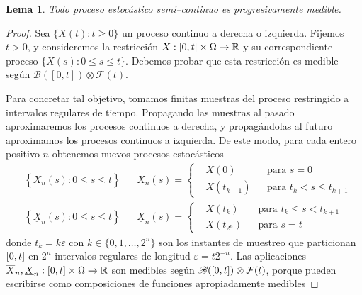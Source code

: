\documentclass{report}
\newcommand{\leftOpenInterval}{\left]}
\newcommand{\rightOpenInterval}{\right[}
\newcommand{\leftClosedInterval}{\left[}
\newcommand{\rightClosedInterval}{\right]}
\newcommand{\interval}[3]{%
    \ifstrequal{#1}{oo}{%
      \leftOpenInterval #2, #3 \rightOpenInterval%
    }{%
      \ifstrequal{#1}{co}{%
        \leftClosedInterval #2, #3 \rightOpenInterval%
      }{%
        \ifstrequal{#1}{oc}{
          \leftOpenInterval #2, #3 \rightClosedInterval%
        }{%
          \ifstrequal{#1}{cc}{
            \leftClosedInterval #2, #3 \rightClosedInterval
          }{%
          }%
        }%
      }%
    }%
  }
\newcommand{\events}{\mathcal{F}}
\newcommand{\borel}{\mathscr{B}}
\newcommand{\realNumbers}{\mathbb{R}}
\theoremstyle{plain}
\newtheorem{lemma}{Lema}
\theoremstyle{remark}
\theoremstyle{definition}
\begin{document}
\begin{lemma}
  \label{lemma:semiContinuousProcessesAreProgressivelyMeasurable}
  Todo proceso estocástico semi--continuo es progresivamente medible.
\end{lemma}
\begin{proof}
  Sea \(\{X(t) : t \geq 0\}\) un proceso continuo a derecha o izquierda.
  Fijemos \(t > 0\), y consideremos la restricción \(X : \interval{cc}{0}{t} \times \Omega \rightarrow \realNumbers\) y su correspondiente proceso \(\{X(s) : 0 \leq s \leq t\}\).
  Debemos probar que esta restricción es medible según \(\borel([0, t]) \otimes \events(t)\).

  Para concretar tal objetivo, tomamos finitas muestras del proceso restringido a intervalos regulares de tiempo.
  Propagando las muestras al pasado aproximaremos los procesos continuos a derecha, y propagándolas al futuro aproximamos los procesos continuos a izquierda.
  De este modo, para cada entero positivo \(n\) obtenemos nuevos procesos estocásticos
  \newcommand{\backPropagation}[1]{\overline{#1}}
  \newcommand{\forwardPropagation}[1]{\underline{#1}}
  \begin{align}
    &\left\{ \backPropagation{X}_n(s) : 0 \leq s \leq t \right\}
    &&
    \backPropagation{X}_n(s)
    =
    \left\{
      \begin{aligned}
        &X(0) 
          &&\text{para } 
            s = 0
          \\
        &X(t_{k + 1})
          &&\text{para }
            t_k < s \leq t_{k + 1}
      \end{aligned}
    \right.
    \\
    &\left\{ \forwardPropagation{X}_n(s) : 0 \leq s \leq t \right\}
    &&
    \forwardPropagation{X}_n(s)
    =
    \left\{
      \begin{aligned}
        &X(t_k)
          &&\text{para }
            t_k \leq s < t_{k + 1}
        \\
        &X(t_{2^n}) 
          &&\text{para } 
            s = t
      \end{aligned}
    \right.
  \end{align}
  donde \(t_k = k \varepsilon\) con \(k \in \{0, 1, \dots, 2^n\}\) son los instantes de muestreo que particionan \(\interval{cc}{0}{t}\) en \(2^n\) intervalos regulares de longitud \(\varepsilon = t 2^{- n}\).
  Las aplicaciones \(\backPropagation{X}_n, \forwardPropagation{X}_n : \interval{cc}{0}{t} \times \Omega \rightarrow \realNumbers\) son medibles según \(\borel(\interval{cc}{0}{t}) \otimes \events(t)\), porque pueden escribirse como composiciones de funciones apropiadamente medibles

\end{proof}
\end{document}
